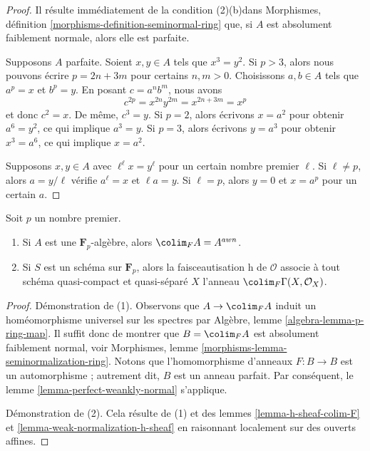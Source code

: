 \begin{proof}
Il résulte immédiatement de la condition (2)(b)\newline dans
Morphismes, définition \ref{morphisms-definition-seminormal-ring}
que, si $A$ est absolument faiblement normale, alors elle est parfaite.

\medskip\noindent
Supposons $A$ parfaite. Soient $x, y \in A$ tels que $x^3 = y^2$.
Si $p > 3$, alors nous pouvons écrire $p = 2n + 3m$ pour certains $n, m > 0$.
Choisissons $a, b \in A$ tels que $a^p = x$ et $b^p = y$.
En posant $c = a^n b^m$, nous avons
$$
c^{2p} = x^{2n} y^{2m} = x^{2n + 3m} = x^p
$$
et donc $c^2 = x$. De même, $c^3 = y$. Si $p = 2$, alors
écrivons $x = a^2$ pour obtenir $a^6 = y^2$, ce qui implique $a^3 = y$.
Si $p = 3$, alors écrivons $y = a^3$ pour obtenir $x^3 = a^6$, ce qui
implique $x = a^2$.

\medskip\noindent
Supposons $x, y \in A$ avec $\ell^\ell x = y^\ell$ pour un certain nombre
premier $\ell$. Si $\ell \not = p$, alors $a = y/\ell$ vérifie
$a^\ell = x$ et $\ell a = y$. Si $\ell = p$, alors
$y = 0$ et $x = a^p$ pour un certain $a$.
\end{proof}

\begin{lemma}
\label{lemma-char-p}
Soit $p$ un nombre premier.
\begin{enumerate}
\item Si $A$ est une $\mathbf{F}_p$-algèbre, alors $\colim_F A = A^{awn}$.
\item Si $S$ est un schéma sur $\mathbf{F}_p$, alors la
faisceautisation h de $\mathcal{O}$ associe à tout schéma quasi-compact
et quasi-séparé $X$ l'anneau $\colim_F \Gamma(X, \mathcal{O}_X)$.
\end{enumerate}
\end{lemma}

\begin{proof}
Démonstration de (1). Observons que $A \to \colim_F A$ induit un
homéomorphisme universel sur les spectres par
Algèbre, lemme \ref{algebra-lemma-p-ring-map}.
Il suffit donc de montrer que $B = \colim_F A$ est
absolument faiblement normal, voir
Morphismes, lemme \ref{morphisms-lemma-seminormalization-ring}.
Notons que l'homomorphisme d'anneaux $F : B \to B$ est un automorphisme ;
autrement dit, $B$ est un anneau parfait. Par conséquent, le
lemme \ref{lemma-perfect-weankly-normal} s'applique.

\medskip\noindent
Démonstration de (2). Cela résulte de (1) et des
lemmes \ref{lemma-h-sheaf-colim-F} et
\ref{lemma-weak-normalization-h-sheaf}
en raisonnant localement sur des ouverts affines.
\end{proof}






